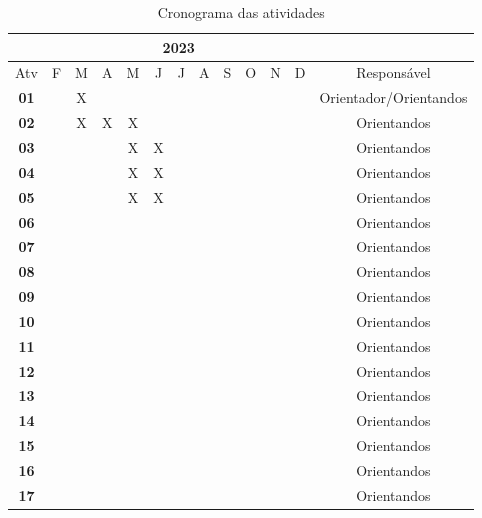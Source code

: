 \begin{table*}[ht]
\centering
\caption{Cronograma das atividades}
\label{tab:cronograma}
    \begin{tabular}{|c|c|c|c|c|c|c|c|c|c|c|c|c|}
        \hline & \multicolumn{11}{|c|}{2023} & \multicolumn{1}{|c|}{} \\
        \hline \multicolumn{1}{|c|}{Atv} & F & M & A & M & J & J & A & S & O & N & D & {Responsável} \\
        \hline \textbf{01} & & X& & & & & & & & & & Orientador/Orientandos \\
        \hline \textbf{02} & & X& X& X& & & & & & & & Orientandos \\
        \hline \textbf{03} & & & & X& X& & & & & & & Orientandos\\
        \hline \textbf{04} & & & & X& X& & & & & & & Orientandos\\
        \hline \textbf{05} & & & & X& X& & & & & & & Orientandos\\
        \hline \textbf{06} & & & & & & & & & & & & Orientandos\\
        \hline \textbf{07} & & & & & & & & & & & & Orientandos\\
        \hline \textbf{08} & & & & & & & & & & & & Orientandos\\
        \hline \textbf{09} & & & & & & & & & & & & Orientandos\\
        \hline \textbf{10} & & & & & & & & & & & & Orientandos\\
        \hline \textbf{11} & & & & & & & & & & & & Orientandos\\
        \hline \textbf{12} & & & & & & & & & & & & Orientandos\\
        \hline \textbf{13} & & & & & & & & & & & & Orientandos\\
        \hline \textbf{14} & & & & & & & & & & & & Orientandos\\
        \hline \textbf{15} & & & & & & & & & & & & Orientandos\\
        \hline \textbf{16} & & & & & & & & & & & & Orientandos\\
        \hline \textbf{17} & & & & & & & & & & & & Orientandos\\
        \hline
    \end{tabular} 
\end{table*}

    
    
    